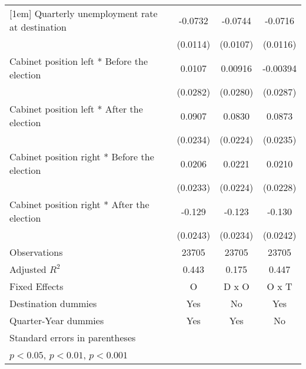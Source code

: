\begin{table}[htbp]
\begin{tabular}{l*{3}{c}}
[1em]
Quarterly unemployment rate at destination&     -0.0732\sym{***}&     -0.0744\sym{***}&     -0.0716\sym{***}\\
                    &    (0.0114)         &    (0.0107)         &    (0.0116)         \\
[1em]
Cabinet position left * Before the election&      0.0107         &     0.00916         &    -0.00394         \\
                    &    (0.0282)         &    (0.0280)         &    (0.0287)         \\
[1em]
Cabinet position left * After the election&      0.0907\sym{***}&      0.0830\sym{***}&      0.0873\sym{***}\\
                    &    (0.0234)         &    (0.0224)         &    (0.0235)         \\
[1em]
Cabinet position right * Before the election&      0.0206         &      0.0221         &      0.0210         \\
                    &    (0.0233)         &    (0.0224)         &    (0.0228)         \\
[1em]
Cabinet position right * After the election&      -0.129\sym{***}&      -0.123\sym{***}&      -0.130\sym{***}\\
                    &    (0.0243)         &    (0.0234)         &    (0.0242)         \\
\hline
Observations        &       23705         &       23705         &       23705         \\
Adjusted \(R^{2}\)  &       0.443         &       0.175         &       0.447         \\
Fixed Effects       &           O         &       D x O         &       O x T         \\
Destination dummies &         Yes         &          No         &         Yes         \\
Quarter-Year dummies&         Yes         &         Yes         &          No         \\
\hline\hline
\multicolumn{4}{l}{\footnotesize Standard errors in parentheses}\\
\multicolumn{4}{l}{\footnotesize \sym{*} \(p<0.05\), \sym{**} \(p<0.01\), \sym{***} \(p<0.001\)}\\
\end{tabular}
\end{table}
